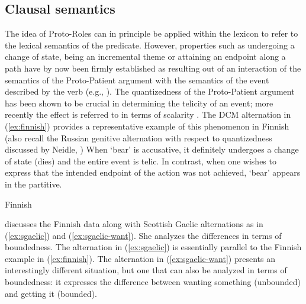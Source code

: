 \documentclass[output=paper,hidelinks]{langscibook}
\begin{document}


\subsection{Clausal semantics}

The idea of Proto-Roles can in principle be applied within the lexicon to refer
to the lexical semantics of the predicate. However, properties such as
undergoing a change of state, being an incremental theme or attaining an
endpoint along a path have by now been firmly established as resulting out of an
interaction of the semantics of the Proto-Patient argument with the semantics of
the event described by the verb (e.g., \citealt{krifka92,verkuyl93}).  The
quantizedness of the Proto-Patient argument has been shown to be crucial in
determining the telicity of an event; more recently the effect is referred to in
terms of scalarity \citep{hayetal99,kennedy-levin08}.  The DCM alternation in
(\ref{ex:finnish}) provides a representative example of this phenomenon in
Finnish (also recall the Russian genitive alternation with respect to
quantizedness discussed by Neidle, ) When `bear' is
accusative, it definitely undergoes a change of state (dies) and the entire
event is telic. In contrast, when one wishes to express that the intended
endpoint of the action was not achieved, `bear'  appears in the partitive. 

\begin{exe}
  \ex \label{ex:finnish}
Finnish
  \begin{xlist}

\end{xlist}
\end{exe}


\citet{ramchand97} discusses the Finnish data along with Scottish Gaelic
alternations as in (\ref{ex:sgaelic}) and (\ref{ex:sgaelic-want}).  She analyzes
the differences in terms of boundedness.  The alternation in (\ref{ex:sgaelic})
is essentially parallel to the Finnish example in (\ref{ex:finnish}).  The alternation in
(\ref{ex:sgaelic-want}) presents an interestingly different situation, but one
that can also be analyzed in terms of boundedness: it 
expresses the difference between wanting
something (unbounded) and getting it (bounded).
\end{document}
